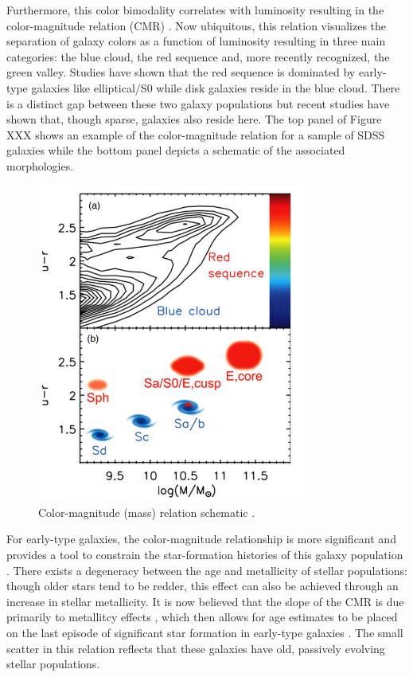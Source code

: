 Furthermore, this color bimodality correlates with luminosity resulting in the color-magnitude relation (CMR) \citep{Baldry2004a, Bell2004}. Now ubiquitous, this relation visualizes the separation of galaxy colors as a function of luminosity resulting in three main categories: the blue cloud, the red sequence and, more recently recognized, the green valley. Studies have shown that the red sequence is dominated by early-type galaxies like elliptical/S0 while disk galaxies reside in the blue cloud. There is a distinct gap between these two galaxy populations but recent studies have shown that, though sparse, galaxies also reside here. The top panel of Figure XXX \citep[credit:][]{Kormendy2012} shows an example of the color-magnitude relation for a sample of SDSS galaxies while the bottom panel depicts a schematic of the associated morphologies. 

\begin{figure}
\centering
\includegraphics[width=3.5in]{Figures/kormendy_CMR.png}
\caption{Color-magnitude (mass) relation schematic \citep[credit:][]{Kormendy2012}.}
\end{figure}

For early-type galaxies, the color-magnitude relationship is more significant and provides a tool to constrain the star-formation histories of this galaxy population \citep{Sandage1978, Tully1982}. There exists a degeneracy between the age and metallicity of stellar populations: though older stars tend to be redder, this effect can also be achieved through an increase in stellar metallicity. It is now believed that the slope of the CMR is due primarily to metallitcy effects \citep{Bower1992, Kodama1997}, which then allows for age estimates to be placed on the last episode of significant star formation in early-type galaxies \citep[e.g.,][]{LopezCruz2004}. The small scatter in this relation reflects that these galaxies have old, passively evolving stellar populations. 

